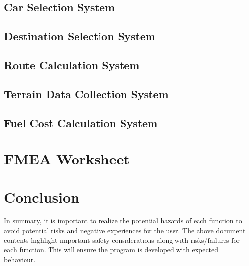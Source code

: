\documentclass{article}
\begin{document}
\subsection{Car Selection System}


\subsection{Destination Selection System}

\subsection{Route Calculation System}

\subsection{Terrain Data Collection System}

\subsection{Fuel Cost Calculation System}

\section{FMEA Worksheet}

\section{Conclusion}
In summary, it is important to realize the potential hazards of each function to avoid potential risks and negative experiences for the user. The above document contents highlight
important safety considerations along with risks/failures for each function. This will ensure
the program is developed with expected behaviour.
\end{document}
